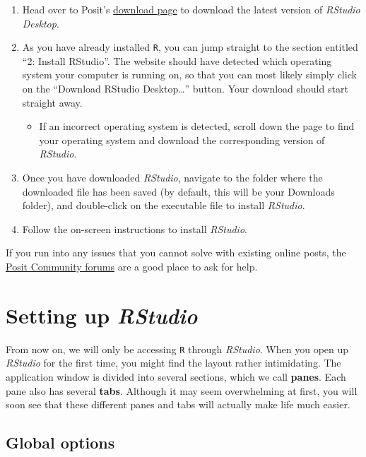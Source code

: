 \documentclass[
  letterpaper,
  DIV=11,
  numbers=noendperiod]{scrreprt}
\providecommand{\tightlist}{%
  \setlength{\itemsep}{0pt}\setlength{\parskip}{0pt}}
\begin{document}
\begin{enumerate}
\def\labelenumi{\arabic{enumi}.}
\item
  Head over to Posit's
  \href{https://posit.co/download/rstudio-desktop/}{download page} to
  download the latest version of \emph{RStudio Desktop}.
\item
  As you have already installed \texttt{R}, you can jump straight to the
  section entitled ``2: Install RStudio''. The website should have
  detected which operating system your computer is running on, so that
  you can most likely simply click on the ``Download RStudio
  Desktop\ldots{}'' button. Your download should start straight away.

  \begin{itemize}
  \tightlist
  \item
    If an incorrect operating system is detected, scroll down the page
    to find your operating system and download the corresponding version
    of \emph{RStudio}.
  \end{itemize}
\item
  Once you have downloaded \emph{RStudio}, navigate to the folder where
  the downloaded file has been saved (by default, this will be your
  Downloads folder), and double-click on the executable file to install
  \emph{RStudio}.
\item
  Follow the on-screen instructions to install \emph{RStudio}.
\end{enumerate}

If you run into any issues that you cannot solve with existing online
posts, the \href{https://forum.posit.co/}{Posit Community forums} are a
good place to ask for help.

\section{\texorpdfstring{Setting up
\emph{RStudio}}{Setting up RStudio}}\label{sec-SettingupR}

From now on, we will only be accessing \texttt{R} through
\emph{RStudio}. When you open up \emph{RStudio} for the first time, you
might find the layout rather intimidating. The application window is
divided into several sections, which we call \textbf{panes}. Each pane
also has several \textbf{tabs}. Although it may seem overwhelming at
first, you will soon see that these different panes and tabs will
actually make life much easier.

\subsection{Global options}\label{sec-GlobalOptions}
\end{document}
